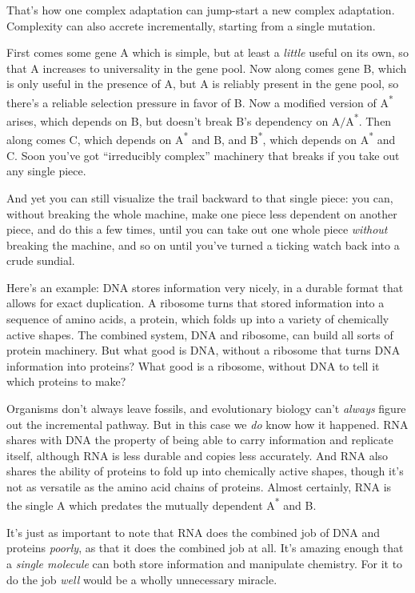 {
 That's how one complex adaptation can jump-start a
new complex adaptation. Complexity can also accrete incrementally,
starting from a single mutation.}

{
 First comes some gene A which is simple, but at least a
\textit{little} useful on its own, so that A increases to universality
in the gene pool. Now along comes gene B, which is only useful in the
presence of A, but A is reliably present in the gene pool, so
there's a reliable selection pressure in favor of B.
Now a modified version of A\textsuperscript{*} arises, which depends on
B, but doesn't break B's dependency on
A$/$A\textsuperscript{*}. Then along comes C, which depends on
A\textsuperscript{*} and B, and B\textsuperscript{*}, which depends on
A\textsuperscript{*} and C. Soon you've got
``irreducibly complex'' machinery
that breaks if you take out any single piece.}

{
 And yet you can still visualize the trail backward to that single
piece: you can, without breaking the whole machine, make one piece less
dependent on another piece, and do this a few times, until you can take
out one whole piece \textit{without} breaking the machine, and so on
until you've turned a ticking watch back into a crude
sundial.}

{
 Here's an example: DNA stores information very
nicely, in a durable format that allows for exact duplication. A
ribosome turns that stored information into a sequence of amino acids,
a protein, which folds up into a variety of chemically active shapes.
The combined system, DNA and ribosome, can build all sorts of protein
machinery. But what good is DNA, without a ribosome that turns DNA
information into proteins? What good is a ribosome, without DNA to tell
it which proteins to make?}

{
 Organisms don't always leave fossils, and
evolutionary biology can't \textit{always} figure out
the incremental pathway. But in this case we \textit{do} know how it
happened. RNA shares with DNA the property of being able to carry
information and replicate itself, although RNA is less durable and
copies less accurately. And RNA also shares the ability of proteins to
fold up into chemically active shapes, though it's not
as versatile as the amino acid chains of proteins. Almost certainly,
RNA is the single A which predates the mutually dependent
A\textsuperscript{*} and B.}

{
 It's just as important to note that RNA does the
combined job of DNA and proteins \textit{poorly}, as that it does the
combined job at all. It's amazing enough that a
\textit{single molecule} can both store information and manipulate
chemistry. For it to do the job \textit{well} would be a wholly
unnecessary miracle.}

